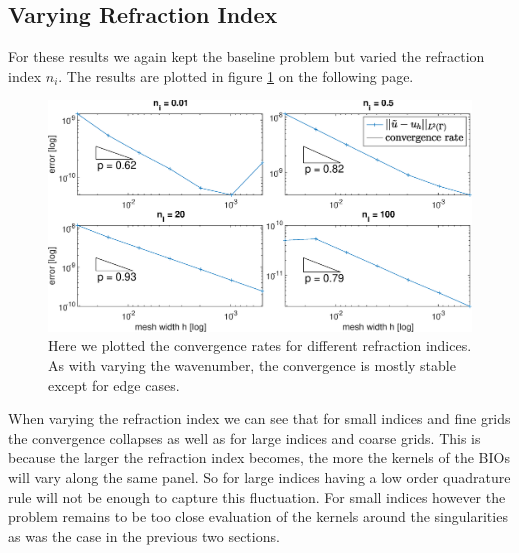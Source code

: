 \documentclass[a4paper, oneside]{discothesis}
\begin{document}
\subsection{Varying Refraction Index}
For these results we again kept the baseline problem but varied the refraction index $n_i$.
The results are plotted in figure \ref{fig:refraction} on the following page.
\begin{figure} [!ht]
	\centering
	\includegraphics[width=\columnwidth]{figures/refraction.eps}
	\caption{
		Here we plotted the convergence rates for different refraction indices.
	As with varying the wavenumber, the convergence is mostly stable except for edge cases.}
	\label{fig:refraction}
\end{figure}
When varying the refraction index we can see that for small indices and fine grids the convergence collapses as well as for large indices and coarse grids.
This is because the larger the refraction index becomes, the more the kernels of the BIOs will vary along the same panel.
So for large indices having a low order quadrature rule will not be enough to capture this fluctuation.
For small indices however the problem remains to be too close evaluation of the kernels around the singularities as was the case in the previous two sections.
\end{document}
